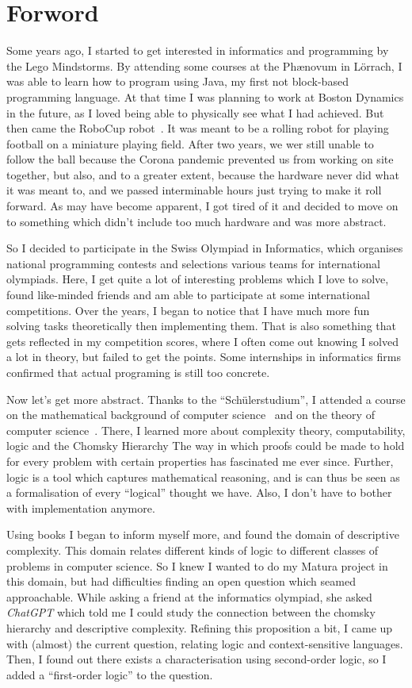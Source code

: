 \chapter*{Forword}

Some years ago, I started to get interested in informatics and programming by the Lego Mindstorms.
By attending some courses at the Ph\ae novum in Lörrach, I was able to learn how to program using Java, my first not block-based programming language.
At that time I was planning to work at Boston Dynamics in the future, as I loved being able to physically see what I had achieved.
But then came the RoboCup robot~\cite{roboCup}.
It was meant to be a rolling robot for playing football on a miniature playing field.
After two years, we wer still unable to follow the ball because the Corona pandemic prevented us from working on site together, but also, and to a greater extent, because the hardware never did what it was meant to, and we passed interminable hours just trying to make it roll forward.
As may have become apparent, I got tired of it and decided to move on to something which didn't include too much hardware and was more abstract.

So I decided to participate in the Swiss Olympiad in Informatics, which organises national programming contests and selections various teams for international olympiads.
Here, I get quite a lot of interesting problems which I love to solve, found like-minded friends and am able to participate at some international competitions.
Over the years, I began to notice that I have much more fun solving tasks theoretically then implementing them.
That is also something that gets reflected in my competition scores, where I often come out knowing I solved a lot in theory, but failed to get the points.
Some internships in informatics firms confirmed that actual programing is still too concrete.

Now let's get more abstract.
Thanks to the ``Schülerstudium'', I attended a course on the mathematical background of computer science~\cite{discrete-maths} and on the theory of computer science~\cite{theory-cs}.
There, I learned more about complexity theory, computability, logic and the Chomsky Hierarchy
The way in which proofs could be made to hold for every problem with certain properties has fascinated me ever since.
Further, logic is a tool which captures mathematical reasoning, and is can thus be seen as a formalisation of every ``logical'' thought we have.
Also, I don't have to bother with implementation anymore.

Using books I began to inform myself more, and found the domain of descriptive complexity.
This domain relates different kinds of logic to different classes of problems in computer science.
So I knew I wanted to do my Matura project in this domain, but had difficulties finding an open question which seamed approachable.
While asking a friend at the informatics olympiad, she asked \emph{ChatGPT} which told me I could study the connection between the chomsky hierarchy and descriptive complexity.
Refining this proposition a bit, I came up with (almost) the current question, relating logic and context-sensitive languages.
Then, I found out there exists a characterisation using second-order logic, so I added a ``first-order logic'' to the question.
